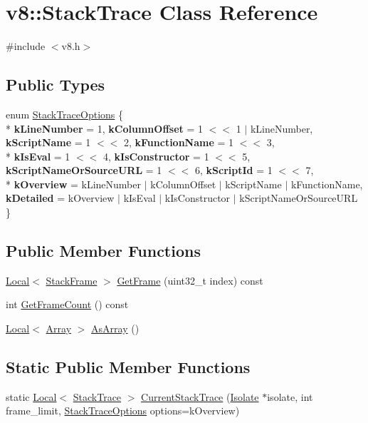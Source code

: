 \hypertarget{classv8_1_1StackTrace}{\section{v8\-:\-:Stack\-Trace Class Reference}
\label{classv8_1_1StackTrace}
}


{\ttfamily \#include $<$v8.\-h$>$}

\subsection*{Public Types}
\begin{DoxyCompactItemize}
\item 
enum \hyperlink{classv8_1_1StackTrace_a9704e4a37949eb8eb8ccddbddf161492}{Stack\-Trace\-Options} \{ \\*
{\bfseries k\-Line\-Number} =  1, 
{\bfseries k\-Column\-Offset} =  1 $<$$<$ 1 $|$ k\-Line\-Number, 
{\bfseries k\-Script\-Name} =  1 $<$$<$ 2, 
{\bfseries k\-Function\-Name} =  1 $<$$<$ 3, 
\\*
{\bfseries k\-Is\-Eval} =  1 $<$$<$ 4, 
{\bfseries k\-Is\-Constructor} =  1 $<$$<$ 5, 
{\bfseries k\-Script\-Name\-Or\-Source\-U\-R\-L} =  1 $<$$<$ 6, 
{\bfseries k\-Script\-Id} =  1 $<$$<$ 7, 
\\*
{\bfseries k\-Overview} =  k\-Line\-Number $|$ k\-Column\-Offset $|$ k\-Script\-Name $|$ k\-Function\-Name, 
{\bfseries k\-Detailed} =  k\-Overview $|$ k\-Is\-Eval $|$ k\-Is\-Constructor $|$ k\-Script\-Name\-Or\-Source\-U\-R\-L
 \}
\end{DoxyCompactItemize}
\subsection*{Public Member Functions}
\begin{DoxyCompactItemize}
\item 
\hyperlink{classv8_1_1Local}{Local}$<$ \hyperlink{classv8_1_1StackFrame}{Stack\-Frame} $>$ \hyperlink{classv8_1_1StackTrace_a6fd5ba809b5d87032d70d32f0b1a80e8}{Get\-Frame} (uint32\-\_\-t index) const 
\item 
int \hyperlink{classv8_1_1StackTrace_aafafebce6c034f1f6f4a870e8f52431e}{Get\-Frame\-Count} () const 
\item 
\hyperlink{classv8_1_1Local}{Local}$<$ \hyperlink{classv8_1_1Array}{Array} $>$ \hyperlink{classv8_1_1StackTrace_abd36f712b3ab986b572aa259b06bf5bd}{As\-Array} ()
\end{DoxyCompactItemize}
\subsection*{Static Public Member Functions}
\begin{DoxyCompactItemize}
\item 
static \hyperlink{classv8_1_1Local}{Local}$<$ \hyperlink{classv8_1_1StackTrace}{Stack\-Trace} $>$ \hyperlink{classv8_1_1StackTrace_a030e8de1b13d720bb2bfac5cb8bc914b}{Current\-Stack\-Trace} (\hyperlink{classv8_1_1Isolate}{Isolate} $\ast$isolate, int frame\-\_\-limit, \hyperlink{classv8_1_1StackTrace_a9704e4a37949eb8eb8ccddbddf161492}{Stack\-Trace\-Options} options=k\-Overview)
\end{DoxyCompactItemize}


